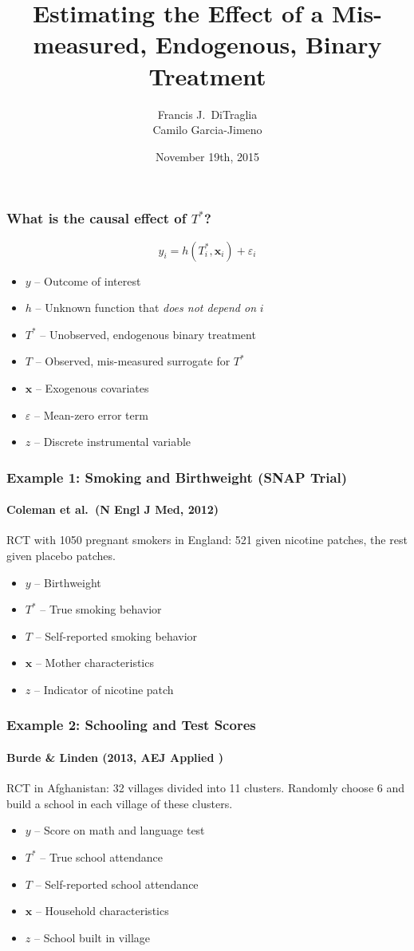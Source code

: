 \documentclass{beamer}
\title[Binary Regressors]{Estimating the Effect of a Mis-measured, Endogenous, Binary Treatment}
\author[FJ DiTraglia]{Francis J.\ DiTraglia\\ Camilo Garcia-Jimeno}
\institute{University of Pennsylvania}
\date{November 19th, 2015}
\begin{document}
 

\begin{frame}[plain]
	\titlepage 
\end{frame} 
\begin{frame}
  \frametitle{What is the causal effect of $T^*$?}
  \[ y_i = h(T^*_i, \mathbf{x}_i) + \varepsilon_i\]
  \begin{itemize}
    \item $y$ -- Outcome of interest
    \item $h$ -- Unknown function that \emph{does not depend on} $i$
    \item $T^*$ -- Unobserved, endogenous binary treatment
    \item $T$ -- Observed, mis-measured surrogate for $T^*$
    \item $\mathbf{x}$ -- Exogenous covariates
    \item $\varepsilon$ -- Mean-zero error term
    \item $z$ -- Discrete instrumental variable
  \end{itemize}
\end{frame}
\begin{frame}
  \frametitle{Example 1: Smoking and Birthweight (SNAP Trial)}
\framesubtitle{Coleman et al.\ (N Engl J Med, 2012)}
  RCT with 1050 pregnant smokers in England: 521 given nicotine patches, the rest given placebo patches.
\begin{itemize}
  \item $y$ -- Birthweight 
  \item $T^*$ -- True smoking behavior 
  \item $T$ -- Self-reported smoking behavior
  \item $\mathbf{x}$ -- Mother characteristics
  \item $z$ -- Indicator of nicotine patch
\end{itemize}
   
\end{frame}
\begin{frame}
  \frametitle{Example 2: Schooling and Test Scores}
\framesubtitle{Burde \& Linden (2013, AEJ Applied )}
  RCT in Afghanistan: 32 villages divided into 11 clusters. Randomly choose 6 and build a school in each village of these clusters. 

\begin{itemize}
  \item $y$ -- Score on math and language test 
  \item $T^*$ -- True school attendance
  \item $T$ -- Self-reported school attendance
  \item $\mathbf{x}$ -- Household characteristics
  \item $z$ -- School built in village
\end{itemize}
   
\end{frame}
\end{document}
